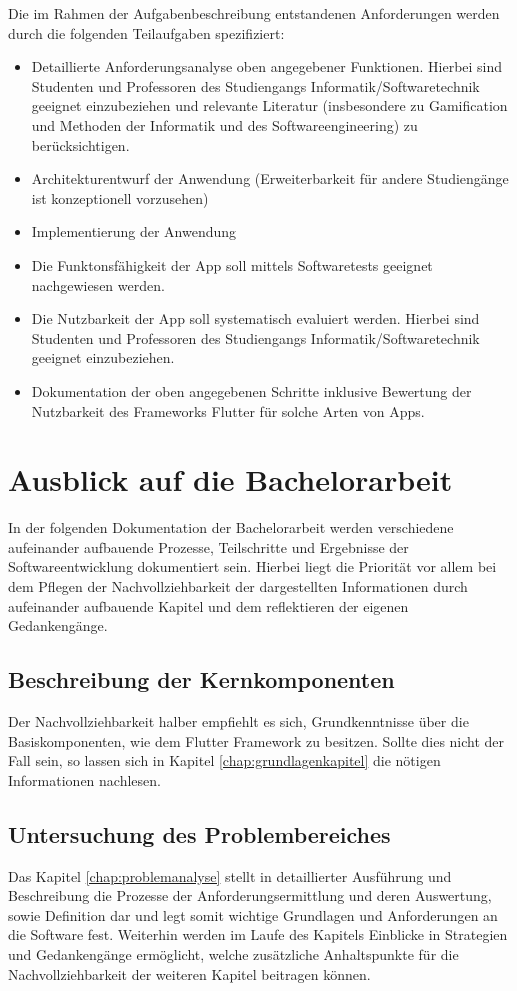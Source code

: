 \documentclass{scrreprt}
\begin{document}
Die im Rahmen der Aufgabenbeschreibung entstandenen Anforderungen werden durch die folgenden Teilaufgaben spezifiziert:
\begin{itemize}
\item Detaillierte Anforderungsanalyse oben angegebener Funktionen. Hierbei sind Studenten und Professoren des Studiengangs Informatik/Softwaretechnik geeignet einzubeziehen und relevante Literatur (insbesondere zu Gamification und Methoden der Informatik und des Softwareengineering) zu berücksichtigen.
\item Architekturentwurf der Anwendung (Erweiterbarkeit für andere Studiengänge ist konzeptionell vorzusehen)
\item Implementierung der Anwendung
\item Die Funktonsfähigkeit der App soll mittels Softwaretests geeignet nachgewiesen werden.
\item Die Nutzbarkeit der App soll systematisch evaluiert werden. Hierbei sind Studenten und Professoren des Studiengangs Informatik/Softwaretechnik geeignet einzubeziehen.
\item Dokumentation der oben angegebenen Schritte inklusive Bewertung der Nutzbarkeit des Frameworks Flutter für solche Arten von Apps.
\end{itemize}

\section{Ausblick auf die Bachelorarbeit}
\par In der folgenden Dokumentation der Bachelorarbeit werden verschiedene aufeinander aufbauende Prozesse, Teilschritte und Ergebnisse der Softwareentwicklung dokumentiert sein. Hierbei liegt die Priorität vor allem bei dem Pflegen der Nachvollziehbarkeit der dargestellten Informationen durch aufeinander aufbauende Kapitel und dem reflektieren der eigenen Gedankengänge.

\subsection{Beschreibung der Kernkomponenten}
\par Der Nachvollziehbarkeit halber empfiehlt es sich, Grundkenntnisse über die Basiskomponenten, wie dem Flutter Framework zu besitzen. Sollte dies nicht der Fall sein, so lassen sich in Kapitel \ref{chap:grundlagenkapitel} die nötigen Informationen nachlesen.

\subsection{Untersuchung des Problembereiches}
\par Das Kapitel \ref{chap:problemanalyse} stellt in detaillierter Ausführung und Beschreibung die Prozesse der Anforderungsermittlung und deren Auswertung, sowie Definition dar und legt somit wichtige Grundlagen und Anforderungen an die Software fest. Weiterhin werden im Laufe des Kapitels Einblicke in Strategien und Gedankengänge ermöglicht, welche zusätzliche Anhaltspunkte für die Nachvollziehbarkeit der weiteren Kapitel beitragen können.
\end{document}
